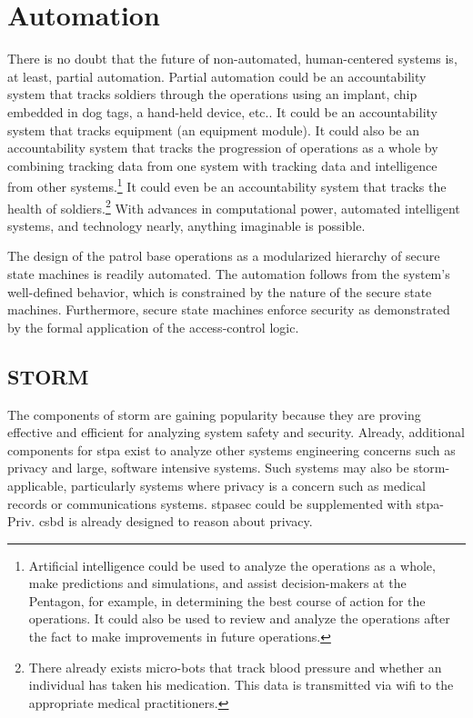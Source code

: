 \documentclass[../../main/main.tex]{subfiles}
\begin{document}
\section{Automation}\label{sec:futureautomation}
There is no doubt that the future of non-automated, human-centered systems is, at least, partial automation.  Partial automation could be an accountability system that tracks soldiers through the operations using an implant, chip embedded in dog tags, a hand-held device, etc..  It could be an accountability system that tracks equipment (an equipment module). It could also be an accountability system that tracks the progression of operations as a whole by combining tracking data from one system with tracking data and intelligence from other systems.\footnote{Artificial intelligence could be used to analyze the operations as a whole, make predictions and simulations, and assist decision-makers at the Pentagon, for example, in determining the best course of action for the operations.  It could also be used to review and analyze the operations after the fact to make improvements in future operations.}  It could even be an accountability system that tracks the health of soldiers.\footnote{There already exists micro-bots that track blood pressure and whether an individual has taken his medication.  This data is transmitted via wifi to the appropriate medical practitioners. }  With advances in computational power, automated intelligent systems, and technology nearly, anything imaginable is possible. 

The design of the patrol base operations as a modularized hierarchy of secure state machines is readily automated. The automation follows from the system's well-defined behavior, which is constrained by the nature of the secure state machines.  Furthermore, secure state machines enforce security as demonstrated by the formal application of the access-control logic.

\subsection{STORM}\label{sec:futurestorm}
The components of \gls{storm} are gaining popularity because they are proving effective and efficient for analyzing system safety and security.  Already, additional components for \gls{stpa} exist to analyze other systems engineering concerns such as privacy and large, software intensive systems.  Such systems may also be \gls{storm}-applicable, particularly systems where privacy is a concern such as medical records or communications systems.  \gls{stpasec} could be supplemented with \gls{stpa}-Priv.   \gls{csbd} is already designed to reason about privacy.
\end{document}
